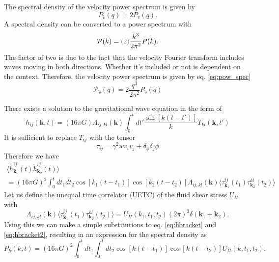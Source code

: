 The spectral density of the velocity power spectrum is given by
\begin{equation}
P_{\tilde{v}} (q) = 2 P_v (q).
\end{equation}
A spectral density can be converted to a power spectrum with
\begin{equation}
\mathcal{P}(k) = \textcolor{gray}{(2)} \frac{k^3}{2 \pi^2} P(k).
\label{eq:pow_spec}
\end{equation}
The factor of two is due to the fact that the velocity Fourier transform includes waves moving in both directions.
Whether it's included or not is dependent on the context.
Therefore, the velocity power spectrum is given by eq. \eqref{eq:pow_spec} \cite[eq. 4.18]{hindmarsh_gw_pt_2019}
\begin{equation}
\mathcal{P}_{\tilde{v}} (q) = 2 \frac{q^3}{2\pi^2} P_{\tilde{v}} (q)
\end{equation}

There exists a solution to the gravitational wave equation in the form of
\begin{equation}
h_{ij} (\bm{k},t) = (16 \pi G) \Lambda_{ij,kl}(\bm{k}) \int_0^t dt' \frac{\sin [k(t-t')]}{k} T_{kl}(\bm{k},t')
\end{equation}
It is sufficient to replace $T_{ij}$ with the tensor
\begin{equation}
\tau_{ij} = \gamma^2 w v_i v_j + \delta_ \phi \delta_j \phi
\end{equation}
Therefore we have
\begin{multline}
\langle \dot{h}_{\bm{k}_1}^{ij}(t) \dot{h}_{\bm{k}_2}^{ij}(t) \rangle \\
= (16 \pi G)^2 \int_0^t dt_1 dt_2 \cos [k_1(t-t_1)] \cos [k_2(t-t_2)] \Lambda_{ij,kl}(\bm{k})
\langle \tau_{\bm{k}_1}^{ij}(t_1) \tau_{\bm{k}_2}^{kl}(t_2) \rangle
\end{multline}
Let us define the unequal time correlator (UETC) of the fluid shear stress $U_\Pi$ with
\begin{equation}
\Lambda_{ij,kl}(\bm{k}) \langle \tau_{\bm{k}_1}^{ij}(t_1) \tau_{\bm{k}_2}^{kl}(t_2) \rangle
= U_\Pi (k_1, t_1, t_2) (2 \pi)^3 \delta(\bm{k}_1 + \bm{k}_2).
\label{eq:hbracket2}
\end{equation}
Using this we can make a simple substitutions to eq. \eqref{eq:hbracket} and \eqref{eq:hbracket2},
resulting in an expression for the spectral density as
\begin{equation}
P_{\dot{h}} (k,t) = (16 \pi G)^2 \int_0^t dt_1 \int_0^t dt_2 \cos [k(t-t_1)] \cos [k(t-t_2)] U_\Pi (k, t_1, t_2).
\end{equation}


